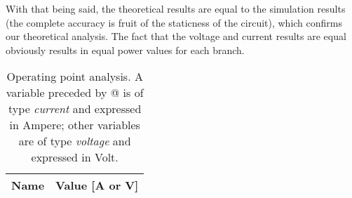 With that being said, the theoretical results are equal to the simulation results (the complete accuracy is fruit of the staticness of the circuit), which confirms our theoretical analysis. The fact that the voltage and current results are equal obviously results in equal power values for each branch.

\begin{table}[h]
  \centering
  \begin{tabular}{|l|r|}
    \hline    
    {\bf Name} & {\bf Value [A or V]} \\ \hline
    
  \end{tabular}
  \caption{Operating point analysis. A variable preceded by @ is of type {\em current}
    and expressed in Ampere; other variables are of type {\it voltage} and expressed in
    Volt.}
  \label{tab:op}
\end{table}

